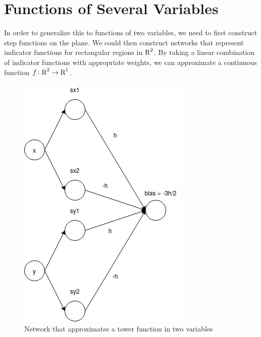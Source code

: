\section{Functions of Several Variables}

In order to generalize this to functions of two variables, we need to first 
construct step functions on the plane. We could then construct networks 
that represent indicator functions for rectangular regions in $\text{R}^2$. By taking a 
linear combination of indicator functions with appropriate weights, we can 
approximate a continuous function $f \colon \text{R}^2 \to \text{R}^1$. 

\begin{figure}[ht]
\begin{center}
\includegraphics[scale=0.5]{TowerFunction.jpg}
\end{center}
\caption{Network that approximates a tower function in two variables}
\label{fig:tower_function}
\end{figure}


